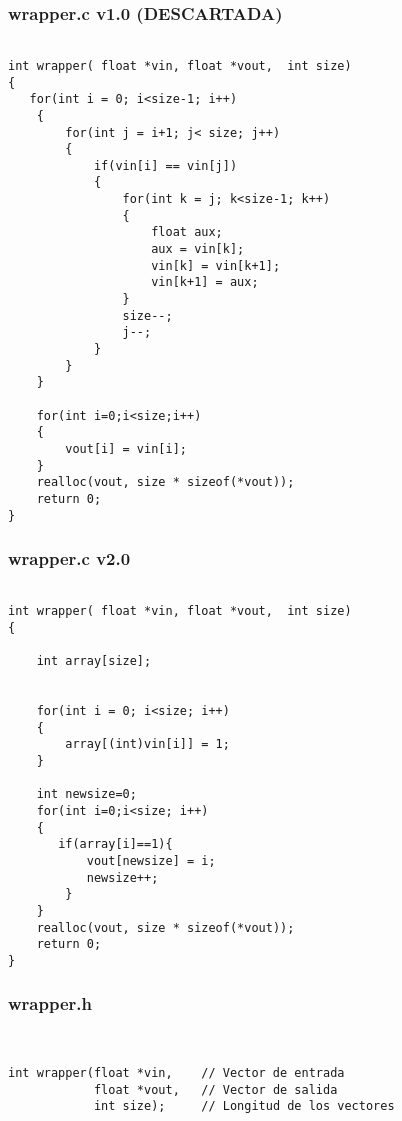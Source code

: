 \documentclass[10pt,journal,compsoc]{IEEEtran}
\begin{document}
\subsubsection{wrapper.c v1.0 (DESCARTADA)}

\begin{lstlisting}[basicstyle=\tiny]

int wrapper( float *vin, float *vout,  int size)
{
   for(int i = 0; i<size-1; i++)
    {
        for(int j = i+1; j< size; j++)
        {
            if(vin[i] == vin[j])
            {
                for(int k = j; k<size-1; k++)
                {
                    float aux;
                    aux = vin[k];
                    vin[k] = vin[k+1];
                    vin[k+1] = aux;
                }
                size--;
                j--;
            }
        }
    }
    
    for(int i=0;i<size;i++)
    {
        vout[i] = vin[i];
    }
    realloc(vout, size * sizeof(*vout));
    return 0;
}

\end{lstlisting}

\subsubsection{wrapper.c v2.0}

\begin{lstlisting}[basicstyle=\tiny]

int wrapper( float *vin, float *vout,  int size)
{

    int array[size];
    
    
    for(int i = 0; i<size; i++)
    {
        array[(int)vin[i]] = 1;
    }
    
    int newsize=0;
    for(int i=0;i<size; i++)
    {
       if(array[i]==1){
           vout[newsize] = i;
           newsize++;
        }
    }
    realloc(vout, size * sizeof(*vout));
    return 0;
}

\end{lstlisting}
\subsubsection{wrapper.h}

\begin{lstlisting}[basicstyle=\tiny]


int wrapper(float *vin,    // Vector de entrada
            float *vout,   // Vector de salida
            int size);     // Longitud de los vectores
            


\end{lstlisting}
\end{document}
